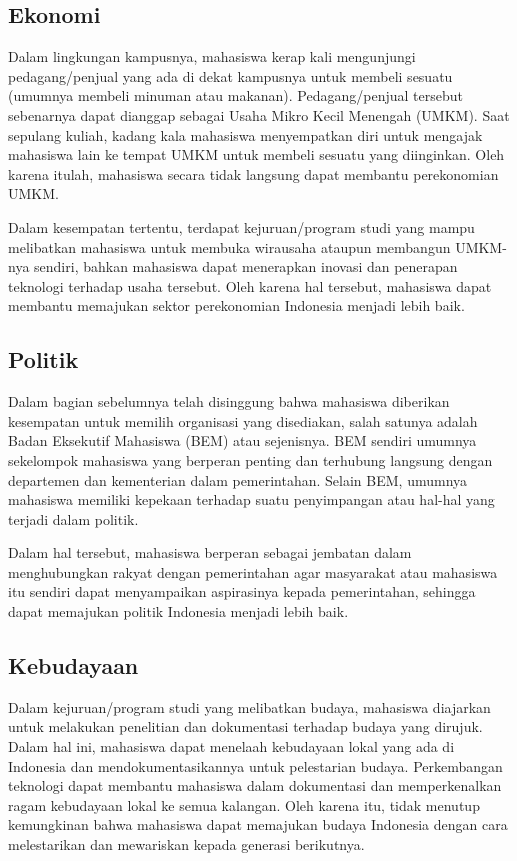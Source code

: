 \subsection{Ekonomi}

Dalam lingkungan kampusnya, mahasiswa kerap kali mengunjungi pedagang/penjual yang ada di dekat kampusnya untuk membeli sesuatu (umumnya membeli minuman atau makanan). Pedagang/penjual tersebut sebenarnya dapat dianggap sebagai Usaha Mikro Kecil Menengah (UMKM). Saat sepulang kuliah, kadang kala mahasiswa menyempatkan diri untuk mengajak mahasiswa lain ke tempat UMKM untuk membeli sesuatu yang diinginkan. Oleh karena itulah, mahasiswa secara tidak langsung dapat membantu perekonomian UMKM.

Dalam kesempatan tertentu, terdapat kejuruan/program studi yang mampu melibatkan mahasiswa untuk membuka wirausaha ataupun membangun UMKM-nya sendiri, bahkan mahasiswa dapat menerapkan inovasi dan penerapan teknologi terhadap usaha tersebut. Oleh karena hal tersebut, mahasiswa dapat membantu memajukan sektor perekonomian Indonesia menjadi lebih baik.

\subsection{Politik}

Dalam bagian sebelumnya telah disinggung bahwa mahasiswa diberikan kesempatan untuk memilih organisasi yang disediakan, salah satunya adalah Badan Eksekutif Mahasiswa (BEM) atau sejenisnya. BEM sendiri umumnya sekelompok mahasiswa yang berperan penting dan terhubung langsung dengan departemen dan kementerian dalam pemerintahan. Selain BEM, umumnya mahasiswa memiliki kepekaan terhadap suatu penyimpangan atau hal-hal yang terjadi dalam politik.

Dalam hal tersebut, mahasiswa berperan sebagai jembatan dalam menghubungkan rakyat dengan pemerintahan agar masyarakat atau mahasiswa itu sendiri dapat menyampaikan aspirasinya kepada pemerintahan, sehingga dapat memajukan politik Indonesia menjadi lebih baik.

\subsection{Kebudayaan}

Dalam kejuruan/program studi yang melibatkan budaya, mahasiswa diajarkan untuk melakukan penelitian dan dokumentasi terhadap budaya yang dirujuk. Dalam hal ini, mahasiswa dapat menelaah kebudayaan lokal yang ada di Indonesia dan mendokumentasikannya untuk pelestarian budaya. Perkembangan teknologi dapat membantu mahasiswa dalam dokumentasi dan memperkenalkan ragam kebudayaan lokal ke semua kalangan. Oleh karena itu, tidak menutup kemungkinan bahwa mahasiswa dapat memajukan budaya Indonesia dengan cara melestarikan dan mewariskan kepada generasi berikutnya.


